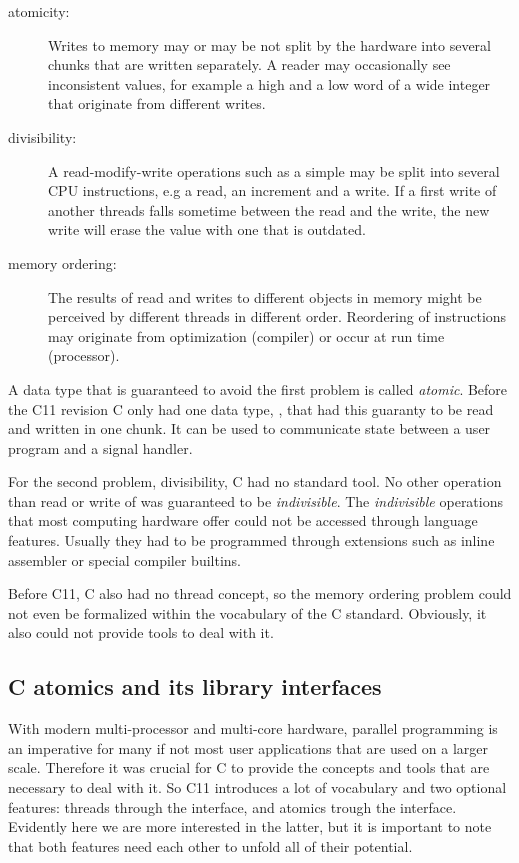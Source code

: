 \begin{description}
\item[{atomicity:}] Writes to memory may or may be not split by the
hardware into several chunks that are written
separately. A reader may occasionally see
inconsistent values, for example a high and a low
word of a wide integer that originate from different
writes.\itemadjust
\item[{divisibility:}] A read-modify-write operations such as a simple
 may be split into several CPU instructions,
e.g a read, an increment and a write. If a first
write of another threads falls sometime between
the read and the write, the new write will erase
the value with one that is outdated.\itemadjust
\item[{memory ordering:}] The results of read and writes to different
objects in memory might be perceived by different threads in
different order. Reordering of instructions may originate from
optimization (compiler) or occur at run time (processor).
\end{description}

\itemadjust
A data type that is guaranteed to avoid the first problem is called
\emph{atomic}. Before the C11 revision C only had one data type,
, that had this guaranty to be read and written in one
chunk. It can be used to communicate state between a user program
and a signal handler.

For the second problem, divisibility, C had no standard tool. No
other operation than read or write of  was guaranteed
to be \emph{indivisible}.  The \emph{indivisible} operations that most
computing hardware offer could not be accessed through language
features. Usually they had to be programmed through extensions such
as inline assembler or special compiler builtins.

Before C11, C also had no thread concept, so the memory ordering
problem could not even be formalized within the vocabulary of the C
standard. Obviously, it also could not provide tools to deal with
it.
\fi

\subsection{C atomics and its library interfaces}
\label{sec-2-1}

\iflong
With modern multi-processor and multi-core hardware, parallel
programming is an imperative for many if not most user applications
that are used on a larger scale. Therefore it was crucial for C to
provide the concepts and tools that are necessary to deal with
it. So C11 introduces a lot of vocabulary and two optional
features: threads through the  interface, and atomics
trough the  interface. Evidently here we are more
interested in the latter, but it is important to note that both
features need each other to unfold all of their potential.

